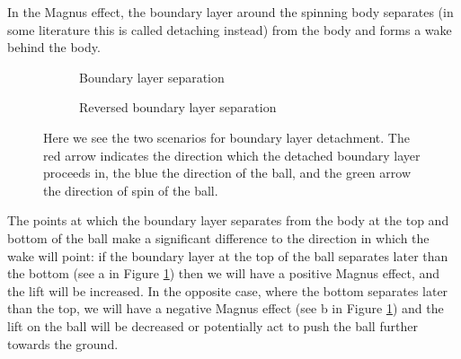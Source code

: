 In the Magnus effect, the boundary layer around the spinning body separates (in some literature this
is called detaching instead) from the body and forms
a wake behind the body.
\begin{figure}[h]
\centering
\begin{subfigure}{.3\textwidth}
\caption{Boundary layer separation}
\end{subfigure}
\quad \qquad
\begin{subfigure}{.3\textwidth}
\caption{Reversed boundary layer separation}
\end{subfigure}
\caption[Diagram of the separation points in the Magnus Effect]{Here we see the two scenarios for
boundary layer detachment. The red arrow indicates the direction which the detached boundary layer
proceeds in, the blue the direction of the ball, and the green arrow the direction of spin of the
ball.}
\label{separation}
\end{figure}

The points at which the boundary layer separates from the body at the top and
bottom of the ball make a significant difference to the direction in which the wake will point: if
the boundary layer at the top of the ball separates later than the bottom (see a in Figure \ref{separation}) then we will have a positive Magnus effect, and the lift will be increased. In the opposite case, 
where the bottom separates later than the top, we will have a negative Magnus effect 
(see b in Figure \ref{separation}) and the lift on the ball will be decreased or potentially act to
push the ball further towards the ground.

